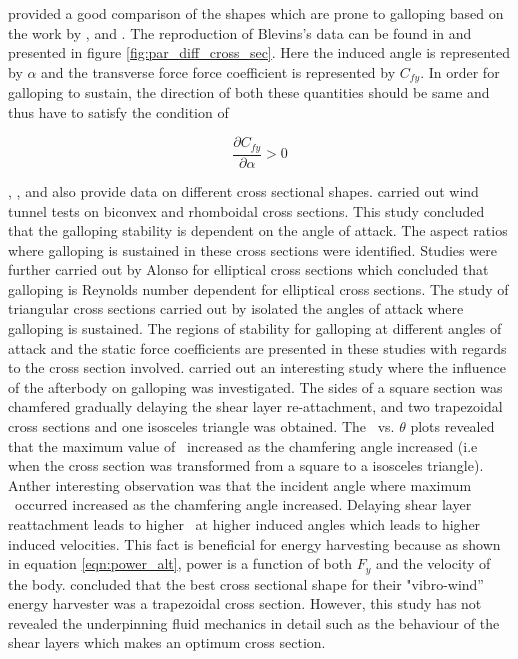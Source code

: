 \citet{Blevins1990} provided a good comparison of the shapes which are prone to galloping based on the work by \citet{Parkinson1961}, \citet{Nakamura1975a} and \citet{Nakamura1977}. The reproduction of Blevins's data can be found in \citet{Paidoussis2010} and presented in figure \ref{fig:par_diff_cross_sec}. Here the induced angle is represented by $\alpha$ and the transverse force force coefficient is represented by $C_{fy}$. In order for galloping to sustain, the direction of both these quantities should be same and thus have to satisfy the condition of 

\begin{equation}
\frac{\partial C_{fy}}{\partial \alpha } >0
\end{equation}  
    
 
 
 
\citet{Naudascher1993}, \citet{Ruscheweyh1996}, \citet{Deniz1997} and \citet{Weaver2005} also provide data on different cross sectional shapes. \citet{Alonso2009} carried out wind tunnel tests on biconvex and rhomboidal cross sections. This study concluded that the galloping stability is dependent on the angle of attack. The aspect ratios where galloping is sustained in these cross sections were identified. Studies were further carried out by Alonso for elliptical cross sections \citep{Alonso2010} which concluded that galloping is Reynolds number dependent for elliptical cross sections. The study of triangular cross sections carried out by \citep{Alonso2005} isolated the angles of attack where galloping is sustained. The regions of stability for galloping at different angles of attack and the static force coefficients are presented in these studies with regards to the cross section involved. \citet{Luo1994} carried out an interesting study where the influence of the afterbody on galloping was investigated. The sides of a square section was chamfered gradually delaying the shear layer re-attachment, and two trapezoidal cross sections and one isosceles triangle was obtained. The \cy\ vs. $\theta$ plots revealed that the maximum value of \cy\ increased as the chamfering angle increased (i.e when the cross section was transformed from a square to a isosceles triangle). Anther interesting observation was that the incident angle where maximum \cy\ occurred increased as the chamfering angle increased. Delaying shear layer reattachment leads to higher \cy\ at higher induced angles which leads to higher induced velocities. This fact is beneficial for energy harvesting because as shown in equation \ref{eqn:power_alt}, power is a function of both $F_{y}$ and the velocity of the body. \citet{Kluger2013} concluded that the best cross sectional shape for their "vibro-wind'' energy harvester was a trapezoidal cross section. However, this study has not revealed the underpinning fluid mechanics in detail such as the behaviour of the shear layers which makes an optimum cross section.

